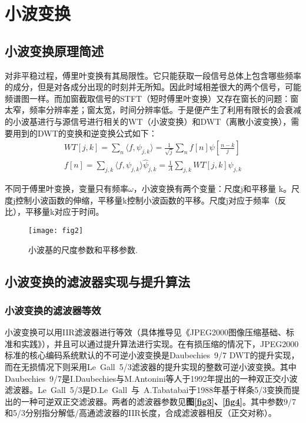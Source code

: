 \section{小波变换}
\subsection{小波变换原理简述}
对非平稳过程，傅里叶变换有其局限性。它只能获取一段信号总体上包含哪些频率的成分，但是对各成分出现的时刻并无所知。因此时域相差很大的两个信号，可能频谱图一样。而加窗截取信号的STFT（短时傅里叶变换）又存在窗长的问题：窗太窄，频率分辨率差；窗太宽，时间分辨率低。于是便产生了利用有限长的会衰减的小波基进行与源信号进行相关的WT（小波变换）和DWT（离散小波变换），需要用到的DWT的变换和逆变换公式如下：
\[
\begin{aligned}
WT[j,k]=\sum_n\langle f,\psi_{j,k}\rangle=\frac{1}{\sqrt{j}}\sum_{n}f[n]\psi[\frac{n-k}{j}]\\
f[n]=\sum_{j,k}\langle f,\psi_{j,k}\rangle\hat{\psi}_{j,k}=\frac{1}{A}\sum_{j,k}WT[j,k]\psi_{j,k}
\end{aligned}
\]

不同于傅里叶变换，变量只有频率$\omega$，小波变换有两个变量：尺度j和平移量 k。尺度j控制小波函数的伸缩，平移量k控制小波函数的平移。尺度j对应于频率（反比），平移量k对应于时间。

\begin{figure}[H]
	\centering
	\texttt{[image: fig2]}
	\caption{小波基的尺度参数和平移参数.}
	\label{fig2}
\end{figure}

\subsection{小波变换的滤波器实现与提升算法}
\subsubsection{小波变换的滤波器等效}
小波变换可以用IIR滤波器进行等效（具体推导见《JPEG2000图像压缩基础、标准和实践》），并且可以通过提升算法进行实现。在有损压缩的情况下，JPEG2000标准的核心编码系统默认的不可逆小波变换是Daubechies 9/7 DWT的提升实现，而在无损情况下则采用Le Gall 5/3滤波器的提升实现的整数可逆小波变换。其中Daubechies 9/7是I.Daubechies与M.Antonini等人于1992年提出的一种双正交小波滤波器。Le Gall 5/3是D.Le Gall 与 A.Tabatabai于1988年基于样条5/3变换而提出的一种可逆双正交滤波器。两者的滤波器参数见\textbf{图\ref{fig3}、\ref{fig4}}。其中参数9/7和5/3分别指分解低/高通滤波器的IIR长度，合成滤波器相反（正交对称）。

